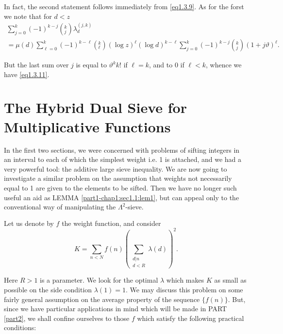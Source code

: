  In fact, the second statement follows immediately from
 \eqref{eq1.3.9}. As 
 for the forst we note that for  $ d < z $  
 \begin{multline*}
   \sum^{k}_{j=0} (-1 )^{k-j} (^k_j) \lambda_d^{(j,k)} \\
   = \mu (d) \sum^{k}_{\ell = 0 } (-1)^{k-\ell} (^k_\ell) ( \log
   z)^\ell (\log d)^{k-\ell}  \sum^{k}_{j = 0 } (-1)^{k-j} (^k_j) (1 +
   j \vartheta)^\ell. 
 \end{multline*}
 
 But the last sum over $j$ is equal to $ \vartheta^k k! $ if $ \ell =
 k $, and to $0$ if $\ell < k $, whence we have \eqref{eq1.3.11}. 

 \section{The Hybrid Dual Sieve for Multiplicative
   Functions}\label{part1-chap1:sec1.4}%
  
 In the first two sections, we were concerned with problems  of
 sifting integers in an interval to each of which the simplest
 weight\pageoriginale 
 i.e. 1 is attached, and we had a very powerful tool: the additive
 large sieve inequality. We are now going to  investigate a similar
 problem on the  assumption that weights not necessarily equal to 1
 are given to the  elements to be  sifted. Then we have no longer such
 useful an aid as  LEMMA \ref{part1-chap1:sec1.1:lem1}, but can appeal
 only to the conventional 
 way of manipulating the  $\Lambda^2 $-sieve. 
 
 Let  us denote by $f$ the weight function, and consider 
 $$
 K= \sum_{n < N } f(n) \left( \sum_{\substack{d | n \\d < R}} \lambda (d)\right)^2.
 $$
 
 Here $R > 1$ is a parameter. We look for the optimal $\lambda$ which
 makes $K$ as small as possible on the side condition $ \lambda (1) =
 1$. We may discuss this problem on some fairly general assumption on
 the average property of the  sequence $\{ f (n)\}$. But, since we
 have particular applications in mind which will be made in  PART
 \ref{part2}, we shall confine ourselves to those $f$ which satisfy the
 following practical conditions: 
 
